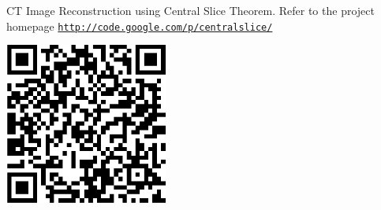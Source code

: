 CT Image Reconstruction using Central Slice Theorem. Refer to the project homepage \href{http://code.google.com/p/centralslice/}{\tt http://code.google.com/p/centralslice/} 

\begin{center}
\includegraphics[width=0.4\textwidth]{qrcode}
\end{center}
